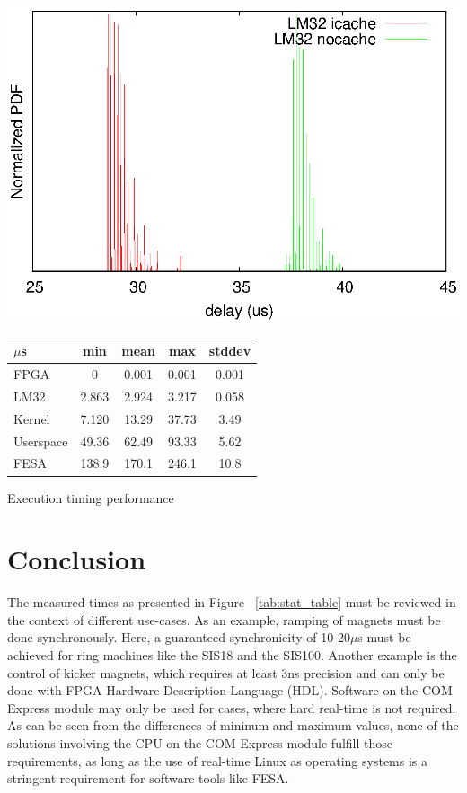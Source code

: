 \documentclass[25pt,halfparskip-,pagesize]{scrartcl}
\begin{document}
\begin{multicols*}{3}
\includegraphics[width=\columnwidth]{../images/lm32plot}
\label{fig:lm32plot}

\centering
  \begin{tabular}{l|c|c|c|c}
   $\mu$s    & min   & mean  & max   & stddev \\
   \hline
    FPGA      & 0 & 0.001 & 0.001 & 0.001 \\
    LM32      & 2.863 & 2.924 & 3.217 & 0.058  \\
    Kernel    & 7.120 & 13.29 & 37.73 & 3.49   \\
    Userspace & 49.36 & 62.49 & 93.33 & 5.62   \\
    FESA      & 138.9 & 170.1 & 246.1 & 10.8 \\
   \end{tabular}
  \caption{Execution timing performance}
\label{tab:stat_table}


\section{Conclusion}
The measured times as presented in Figure ~\ref{tab:stat_table}
must be reviewed in the context of different use-cases. As an example,
ramping of magnets must be done synchronously. Here, a guaranteed
synchronicity of 10-20$\mu$s must be achieved for ring machines like the
SIS18 and the SIS100. Another example is the control of kicker magnets,
which requires  at least 3ns precision and can only be done with FPGA
Hardware Description Language (HDL). Software on the COM Express module
may only be used for cases, where hard real-time is not required.
As can be seen from the differences of mininum and maximum values, none
of the solutions involving the CPU on the COM Express module fulfill
those requirements, as long as the use of real-time Linux as operating
systems is a stringent requirement for software tools like FESA.


\end{multicols*}
\end{document}
